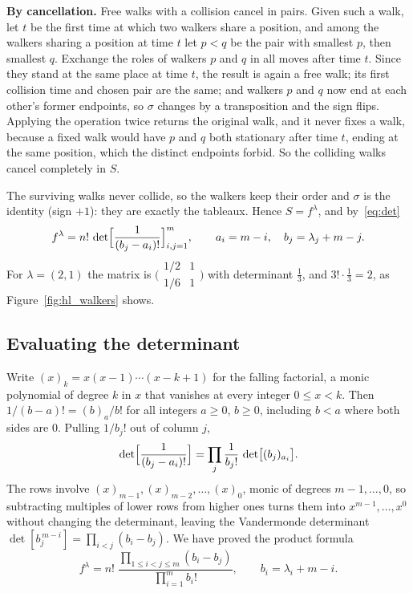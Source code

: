 \documentclass[11pt]{article}
\begin{document}
\textbf{By cancellation.} Free walks with a collision cancel in pairs. Given such a walk, let $t$ be the first time at which two walkers share a position, and among the walkers sharing a position at time $t$ let $p<q$
be the pair with smallest $p$, then smallest $q$. Exchange the roles of walkers $p$ and $q$ in all moves after time $t$. Since they stand at the same place at time $t$, the result is again a free walk; its first collision time and chosen pair are the same;
and walkers $p$ and $q$ now end at each other's former endpoints, so $\sigma$ changes by a transposition and the sign flips. Applying the operation twice returns the original walk, and it never fixes a walk,
because a fixed walk would have $p$ and $q$ both stationary after time $t$, ending at the same position, which the distinct endpoints forbid. So the colliding walks cancel completely in $S$.

The surviving walks never collide, so the walkers keep their order and $\sigma$ is the identity (sign $+1$): they are exactly the tableaux. Hence $S=f^\lambda$, and by~\eqref{eq:det}
\begin{equation}\label{eq:fdet}
  f^\lambda=n!\,\det\Bigl[\frac1{(b_j-a_i)!}\Bigr]_{i,j=1}^m,\qquad a_i=m-i,\quad b_j=\lambda_j+m-j.
\end{equation}
For $\lambda=(2,1)$ the matrix is $\bigl(\begin{smallmatrix}1/2&1\\1/6&1\end{smallmatrix}\bigr)$ with determinant $\frac13$, and $3!\cdot\frac13=2$, as Figure~\ref{fig:hl_walkers} shows.

\subsection{Evaluating the determinant}
Write $(x)_k=x(x-1)\cdots(x-k+1)$ for the falling factorial, a monic polynomial of degree $k$ in $x$ that vanishes at every integer $0\le x<k$. Then $1/(b-a)!=(b)_a/b!$ for all integers $a\ge0$, $b\ge0$,
including $b<a$ where both sides are $0$. Pulling $1/b_j!$ out of column $j$,
\[
  \det\Bigl[\frac1{(b_j-a_i)!}\Bigr]=\prod_j\frac1{b_j!}\,\det\bigl[(b_j)_{a_i}\bigr] .
\]
The rows involve $(x)_{m-1},(x)_{m-2},\dots,(x)_0$, monic of degrees $m-1,\dots,0$, so subtracting multiples of lower rows from higher ones turns them into $x^{m-1},\dots,x^0$ without changing the determinant, leaving the Vandermonde determinant
$\det[b_j^{\,m-i}]=\prod_{i<j}(b_i-b_j)$. We have proved the product formula
\begin{equation}\label{eq:frob}
  f^\lambda=n!\;\frac{\prod_{1\le i<j\le m}(b_i-b_j)}{\prod_{i=1}^m b_i!},\qquad b_i=\lambda_i+m-i .
\end{equation}
\end{document}
